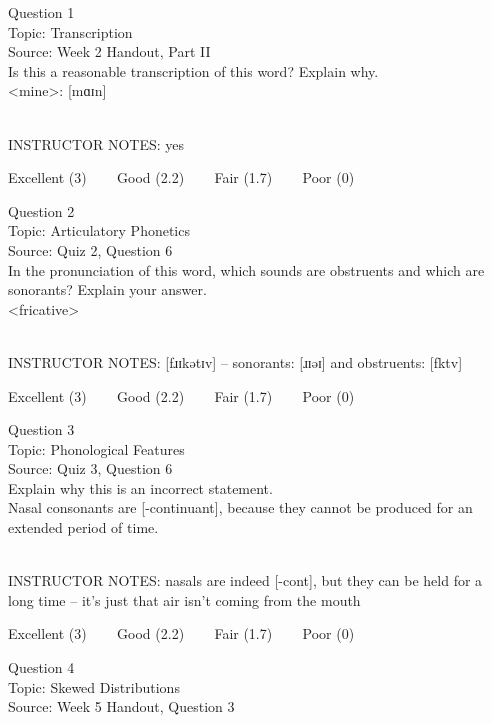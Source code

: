 \documentclass[12pt]{article}
\begin{document}
{\large Question 1}\\

Topic: Transcription\\
Source: Week 2 Handout, Part II\\

Is this a reasonable transcription of this word? Explain why.\\

<mine>: {[mɑɪn]}


~\\
INSTRUCTOR NOTES: yes


\vfill
Excellent (3) ~~~ Good (2.2) ~~~ Fair (1.7) ~~~ Poor (0)
\newpage

{\large Question 2}\\

Topic: Articulatory Phonetics\\
Source: Quiz 2, Question 6\\

In the pronunciation of this word, which sounds are obstruents and which are sonorants? Explain your answer.\\

<fricative>


~\\
INSTRUCTOR NOTES: [fɹɪkətɪv] -- sonorants: [ɹɪəɪ] and obstruents: [fktv]


\vfill
Excellent (3) ~~~ Good (2.2) ~~~ Fair (1.7) ~~~ Poor (0)
\newpage

{\large Question 3}\\

Topic: Phonological Features\\
Source: Quiz 3, Question 6\\

Explain why this is an incorrect statement.\\

Nasal consonants are {[-continuant]}, because they cannot be produced for an extended period of time.


~\\
INSTRUCTOR NOTES: nasals are indeed [-cont], but they can be held for a long time -- it's just that air isn't coming from the mouth


\vfill
Excellent (3) ~~~ Good (2.2) ~~~ Fair (1.7) ~~~ Poor (0)
\newpage

{\large Question 4}\\

Topic: Skewed Distributions\\
Source: Week 5 Handout, Question 3\\
\end{document}

